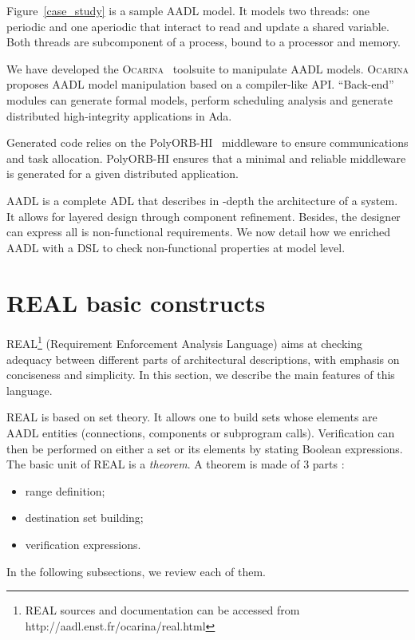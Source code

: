 \documentclass[a4paper,10pt]{article}
\newcommand{\aadl} {\textsc{AADL}}
\newcommand{\real}{\textsc{REAL}}
\newcommand{\ocarina}{\textsc{Ocarina}}
\begin{document}
Figure~\ref{case_study} is a sample \aadl{} model.  It models two
threads: one periodic and one aperiodic that interact to read and update
a shared variable. Both threads are subcomponent of a process,
bound to a processor and memory.

We have developed the \ocarina{}~\cite{enst06ocarina} toolsuite to
manipulate \aadl{} models. \ocarina{} proposes \aadl{} model manipulation
based on a compiler-like API. ``Back-end'' modules can generate
formal models, perform scheduling analysis and generate
distributed high-integrity applications in Ada.

Generated code relies on the PolyORB-HI~\cite{HZP06} middleware to
ensure communications and task allocation. PolyORB-HI ensures that a
minimal and reliable middleware is generated for a given distributed
application.

\aadl{} is a complete ADL that describes in -depth the architecture of
a system. It allows for layered design through component
refinement. Besides, the designer can express all is non-functional
requirements.  We now detail how we enriched \aadl{} with a DSL to
check non-functional properties at model level.

\section {REAL basic constructs}
\label  {language_description}

\real{}\footnote {REAL sources and documentation can be accessed 
from http://aadl.enst.fr/ocarina/real.html} (Requirement Enforcement 
Analysis Language) aims at checking adequacy between different parts 
of architectural descriptions, with emphasis on conciseness and 
simplicity. In this section, we describe the main features of this 
language.

\real{} is based on set theory. It allows one to build sets whose
elements are \aadl{} entities (connections, components or subprogram
calls). Verification can then be performed on either a set or its
elements by stating Boolean expressions. The basic unit of \real{} is
a \textit{theorem}. A theorem is made of 3 parts :
\begin {itemize}
\item range definition;
\item destination set building;
\item verification expressions. 
\end {itemize}
In the following subsections, we review each of them.
\end{document}
